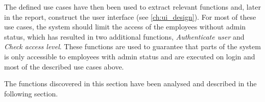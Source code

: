 The defined use cases have then been used to extract relevant functions and, later in the report, construct the user interface (see \autoref{ch:ui_design}). For most of these use cases, the system should limit the access of the employees without admin status, which has resulted in two additional functions, \textit{Authenticate user} and \textit{Check access level}. These functions are used to guarantee that parts of the system is only accessible to employees with admin status and are executed on login and most of the described use cases above.
\par
The functions discovered in this section have been analysed and described in the following section.